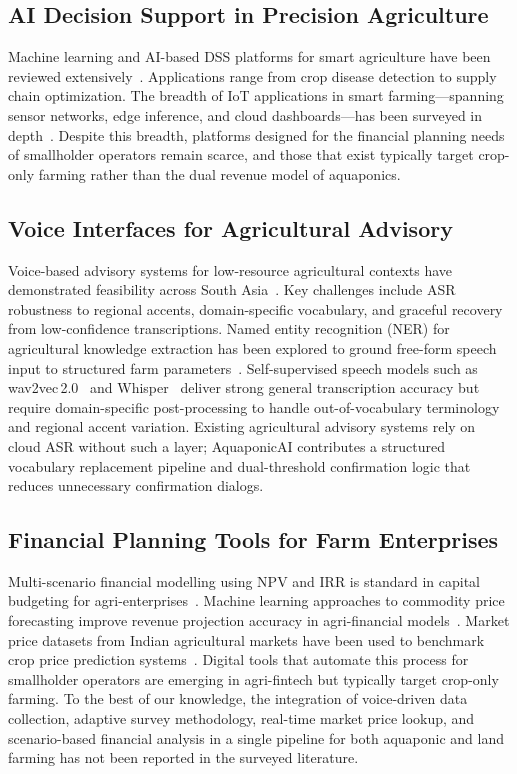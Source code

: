 \documentclass[conference]{IEEEtran}
\begin{document}
\subsection{AI Decision Support in Precision Agriculture}

Machine learning and AI-based DSS platforms for smart agriculture
have been reviewed extensively~\cite{ref2,ref15}. Applications range
from crop disease detection to supply chain optimization.
The breadth of IoT applications in smart farming---spanning sensor
networks, edge inference, and cloud dashboards---has been surveyed
in depth~\cite{ref8,ref16}.
Despite this breadth, platforms designed for the financial planning
needs of smallholder operators remain scarce, and those that exist
typically target crop-only farming rather than the dual revenue model
of aquaponics.

\subsection{Voice Interfaces for Agricultural Advisory}

Voice-based advisory systems for low-resource agricultural contexts
have demonstrated feasibility across South Asia~\cite{ref3,ref20}. Key
challenges include ASR robustness to regional accents, domain-specific
vocabulary, and graceful recovery from low-confidence transcriptions.
Named entity recognition (NER) for agricultural knowledge extraction
has been explored to ground free-form speech input to structured farm
parameters~\cite{ref9}. Self-supervised speech models such as
wav2vec\,2.0~\cite{ref10} and Whisper~\cite{ref5} deliver strong
general transcription accuracy but require domain-specific
post-processing to handle out-of-vocabulary terminology and regional
accent variation. Existing agricultural advisory systems rely on
cloud ASR without such a layer; AquaponicAI contributes a structured
vocabulary replacement pipeline and dual-threshold confirmation logic
that reduces unnecessary confirmation dialogs.

\subsection{Financial Planning Tools for Farm Enterprises}

Multi-scenario financial modelling using NPV and IRR is standard
in capital budgeting for agri-enterprises~\cite{ref4}. Machine
learning approaches to commodity price forecasting improve revenue
projection accuracy in agri-financial models~\cite{ref11}. Market
price datasets from Indian agricultural markets have been used to
benchmark crop price prediction systems~\cite{ref17}. Digital tools
that automate this process for smallholder operators are emerging in
agri-fintech but typically target crop-only farming. To the best of our knowledge, the integration of voice-driven
data collection, adaptive survey methodology, real-time market
price lookup, and scenario-based financial analysis in a single
pipeline for both aquaponic and land farming has not been reported
in the surveyed literature.
\end{document}
